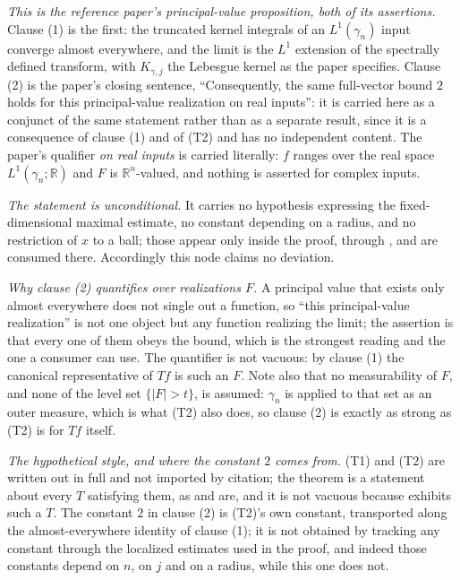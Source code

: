 \begin{theorem}
\emph{This is the reference paper's principal-value proposition, both of its
assertions.}  Clause (1) is the first: the truncated kernel integrals of an
$L^1(\gamma_n)$ input converge almost everywhere, and the limit is the $L^1$
extension of the spectrally defined transform, with $K_{\gamma,j}$ the Lebesgue
kernel as the paper specifies.  Clause (2) is the paper's closing sentence,
``Consequently, the same full-vector bound $2$ holds for this principal-value
realization on real inputs'': it is carried here as a conjunct of the same
statement rather than as a separate result, since it is a consequence of
clause (1) and of (T2) and has no independent content.  The paper's qualifier
\emph{on real inputs} is carried literally: $f$ ranges over the real space
$L^1(\gamma_n;\mathbb{R})$ and $F$ is $\mathbb{R}^n$-valued, and nothing is
asserted for complex inputs.

\emph{The statement is unconditional.}  It carries no hypothesis expressing the
fixed-dimensional maximal estimate, no constant depending on a radius, and no
restriction of $x$ to a ball; those appear only inside the proof, through
, and are consumed there.  Accordingly
this node claims no deviation.

\emph{Why clause (2) quantifies over realizations $F$.}  A principal value that
exists only almost everywhere does not single out a function, so ``this
principal-value realization'' is not one object but any function realizing the
limit; the assertion is that every one of them obeys the bound, which is the
strongest reading and the one a consumer can use.  The quantifier is not
vacuous: by clause (1) the canonical representative of $Tf$ is such an $F$.
Note also that no measurability of $F$, and none of the level set
$\{|F| > t\}$, is assumed: $\gamma_n$ is applied to that set as an outer
measure, which is what (T2) also does, so clause (2) is exactly as strong as
(T2) is for $Tf$ itself.

\emph{The hypothetical style, and where the constant $2$ comes from.}  (T1) and
(T2) are written out in full and not imported by citation; the theorem is a
statement about every $T$ satisfying them, as 
and  are, and it is not vacuous because
 exhibits such a $T$.  The constant $2$ in clause (2) is
(T2)'s own constant, transported along the almost-everywhere identity of
clause (1); it is not obtained by tracking any constant through the localized
estimates used in the proof, and indeed those constants depend on $n$, on $j$
and on a radius, while this one does not.
\end{theorem}
